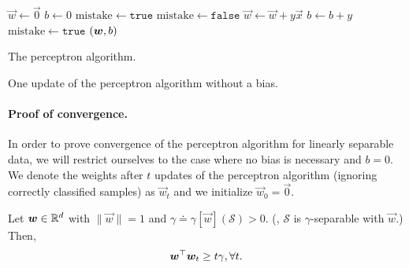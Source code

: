 \begin{algorithm}[t]
    \begin{algorithmic}
        \State $\vec{w} \gets \vec{0}$
        \State $b \gets 0$
        \State $\mathrm{mistake} \gets \mathtt{true}$
        \State $\mathrm{mistake} \gets \mathtt{false}$
        \State $\vec{w} \gets \vec{w} + y \vec{x}$
        \State $b \gets b + y$
        \State $\mathrm{mistake} \gets \mathtt{true}$
        \EndIf
        \EndFor
        \EndWhile
        \State \Return $\lft( \vec{w}, b \rgt)$
    \end{algorithmic}
    \caption{The perceptron algorithm.}
    \label{alg:perc-alg}
\end{algorithm}

\begin{marginfigure}[-7cm]
    \centering
    \caption{One update of the perceptron algorithm without a bias.}
    \label{fig:perceptron-algorithm}
\end{marginfigure}

\paragraph{Proof of convergence.} In order to prove convergence of the perceptron algorithm for linearly separable data, we will
restrict ourselves to the case where no bias is necessary and $b=0$. We denote the weights after
$t$ updates of the perceptron algorithm (ignoring correctly classified samples) as $\vec{w}_t$ and
we initialize $\vec{w}_0 = \vec{0}$.

\begin{lemma}
    \label{lem:perc-1}

    Let $\bm{w} \in \mathbb{R}^d$ with $\| \vec{w} \| = 1$ and $\gamma \doteq \gamma[\vec{w}](\mathcal{S}) >
        0$. (\Ie, $\mathcal{S}$ is $\gamma$-separable with $\vec{w}$.) Then, \[
        \bm{w}^\top \bm{w}_t \geq t \gamma, \forall t.
    \]
\end{lemma}

